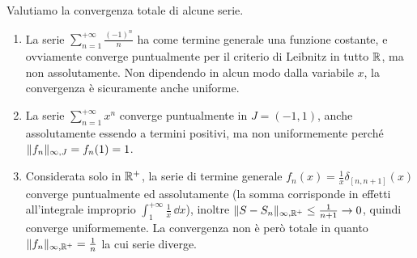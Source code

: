 \begin{esempio} \label{es:convergenza-totale}
	Valutiamo la convergenza totale di alcune serie.
	\begin{enumerate}
		\item La serie $\sum_{n=1}^{+\infty}\frac{(-1)^n}{n}$ ha come termine generale una funzione costante, e ovviamente converge puntualmente per il criterio di Leibnitz in tutto $\mathbb{R}$, ma non assolutamente. Non dipendendo in alcun modo dalla variabile $x$, la convergenza è sicuramente anche uniforme.
		\item La serie $\sum_{n=1}^{+\infty}x^n$ converge puntualmente in $J=(-1,1)$, anche assolutamente essendo a termini positivi, ma non uniformemente perché $\lVert f_n\rVert_{\infty,J}=f_n(1)=1$.
		\item Considerata solo in $\mathbb{R}^+$, la serie di termine generale $f_n(x)=\frac1{x}\delta_{[n,n+1]}\scriptstyle(x)$ converge puntualmente ed assolutamente (la somma corrisponde in effetti all'integrale improprio $\int_1^{+\infty}\frac1{x}\,\scriptstyle\dd x$), inoltre $\lVert S-S_n\rVert_{\infty,\mathbb{R}^+}\leq\frac1{n+1}\to 0$, quindi converge uniformemente. La convergenza non è però totale in quanto $\lVert f_n\rVert_{\infty,\mathbb{R}^+}=\frac1{n}$ la cui serie diverge.
	\end{enumerate}
\end{esempio}

